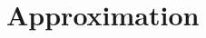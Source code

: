 \documentclass[thmsb,11pt]{article}
\begin{document}
  \section{Approximation}
%   
% 
% 
% 
% 
% 
% 
% 
% 
% 
% 
% 
\end{document}
